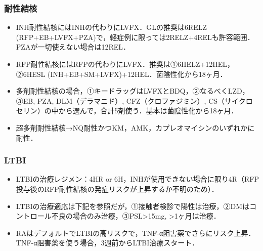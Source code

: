 \subsubsection{耐性結核}

\begin{itemize}

\item INH耐性結核にはINHの代わりにLVFX．GLの推奨は6RELZ (RFP+EB+LVFX+PZA)で，軽症例に限っては2RELZ+4RELも許容範囲．PZAが一切使えない場合は12REL．
\item RFP耐性結核にはRFPの代わりにLVFX．推奨は①6HELZ+12HEL，②6HESL (INH+EB+SM+LVFX)+12HEL．菌陰性化から18ヶ月．
\item 多剤耐性結核の場合，①キードラッグはLVFXとBDQ，②なるべくLZD，③EB, PZA, DLM（デラマニド）, CFZ（クロファジミン）, CS（サイクロセリン）の中から選んで，合計5剤使う．基本は菌陰性化から18ヶ月．
\item 超多剤耐性結核→NQ耐性かつKM，AMK，カプレオマイシンのいずれかに耐性．
\end{itemize}


\subsubsection{LTBI}
\begin{itemize}
\item LTBIの治療レジメン：4HR or 6H，INHが使用できない場合に限り4R（RFP投与後のRFP耐性結核の発症リスクが上昇するか不明のため）．
\item LTBIの治療適応は下記を参照だが，①接触者検診で陽性は治療，②DMはコントロール不良の場合のみ治療，③PSL>15mg, >1ヶ月は治療．
\item RAはデフォルトでLTBIの高リスクで，TNF-α阻害薬でさらにリスク上昇．TNF-α阻害薬を使う場合，3週前からLTBI治療スタート．


\end{itemize}

